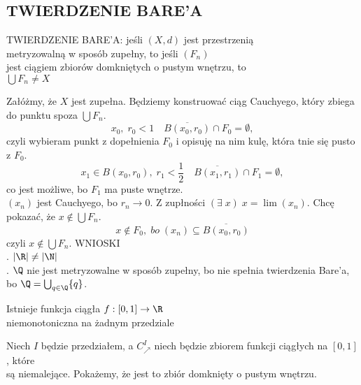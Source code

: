 \subsection{TWIERDZENIE BARE'A}
\begin{center}\large
    {\color{def}TWIERDZENIE BARE'A}: jeśli $(X,d)$ jest przestrzenią \\{\color{acc}metryzowalną w sposób zupełny}, to jeśli $(F_n)$ \\jest ciągiem zbiorów {\color{acc}domkniętych o pustym wnętrzu}, to\smallskip\\
    $\bigcup F_n\neq X$
\end{center}
\dowod
Załóżmy, że $X$ jest zupełna. Będziemy konstruować ciąg Cauchyego, który zbiega do punktu spoza $\bigcup F_n$.
$$x_0,\;r_0<1\quad \overline{B(x_0, r_0)}\cap F_0=\emptyset,$$
czyli wybieram punkt z dopełnienia $F_0$ i opisuję na nim kulę, która tnie się pusto z $F_0$.
$$x_1\in B(x_0, r_0), \;r_1<\frac12\quad \overline{B(x_1, r_1)}\cap F_1=\emptyset,$$
co jest możliwe, bo $F_1$ ma puste wnętrze.\bigskip\\
$(x_n)$ jest Cauchyego, bo $r_n\to0$. Z zupłności $(\exists\;x)\;x=\lim(x_n)$. Chcę pokazać, że $x\notin \bigcup F_n$.
$$x\notin F_0,\;bo\;(x_n)\subseteq \overline{B(x_0,r_0)}$$
czyli $x\notin\bigcup F_n$.
\kondow
{\large\color{acc}WNIOSKI}\medskip\\
. $|\R|\neq|\N|$\smallskip\\
. $\Q$ nie jest metryzowalne w sposób zupełny, bo nie spełnia twierdzenia Bare'a, \\bo $\Q=\bigcup_{q\in\Q}\{q\}$.\bigskip\\
\bigskip
\begin{center}\large
    {\color{acc}Istnieje funkcja ciągła $f:[0,1]\to\R$ \\niemonotoniczna na żadnym przedziale}
\end{center}
\dowod
Niech $I$ będzie przedziałem, a $C^I_\nearrow$ niech będzie zbiorem funkcji ciągłych na $[0,1]$, które \\są niemalejące. Pokażemy, że jest to zbiór domknięty o pustym wnętrzu.